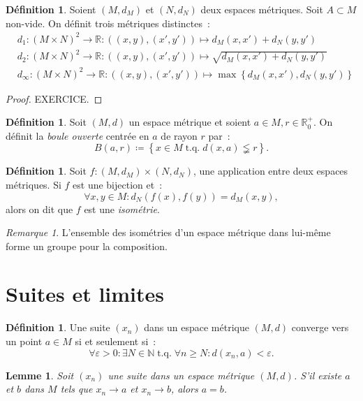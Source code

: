 \documentclass{report}
\newtheorem{lem}[thm]{Lemme}
\theoremstyle{definition}
\newtheorem{déf}[thm]{Définition}
\theoremstyle{remark}
\newtheorem*{rmq}{Remarque}
\DeclareMathOperator{\tq}{\text{ t.q. }}
\newcommand{\R}{\mathbb R}
\newcommand{\N}{\mathbb N}
\begin{document}
			\begin{déf} Soient $(M, d_M)$ et $(N, d_N)$ deux espaces métriques. Soit $A \subset M$ non-vide. On définit trois métriques distinctes~:
			\begin{align*}
				&d_1 : (M \times N)^2 \to \R : ((x, y), (x', y')) \mapsto d_M(x, x') + d_N(y, y') \\
				&d_2 : (M \times N)^2 \to \R : ((x, y), (x', y')) \mapsto \sqrt {d_M(x, x') + d_N(y, y')} \\
				&d_\infty : (M \times N)^2 \to \R : ((x, y), (x', y')) \mapsto \max\left\{d_M(x, x'), d_N(y, y')\right\}
			\end{align*}
			\end{déf}

			\begin{proof} EXERCICE.
			\end{proof}

			\begin{déf} Soit $(M, d)$ un espace métrique et soient $a \in M, r \in \R^+_0$. On définit la \textit{boule ouverte} centrée en $a$ de rayon $r$
			par~:
			\[B(a, r) \coloneqq \left\{x \in M \tq d(x, a) \lneqq r\right\}.\]
			\end{déf}

			\begin{déf} Soit $f : (M, d_M) \times (N, d_N)$, une application entre deux espaces métriques. Si $f$ est une bijection et~:
			\[\forall x, y \in M : d_N(f(x), f(y)) = d_M(x, y),\]
			alors on dit que $f$ est une \textit{isométrie}. \end{déf}

			\begin{rmq} L'ensemble des isométries d'un espace métrique dans lui-même forme un groupe pour la composition. \end{rmq}

	\section{Suites et limites}
		\begin{déf} Une suite $(x_n)$ dans un espace métrique $(M, d)$ converge vers un point $a \in M$ si et seulement si~:
		\[\forall \varepsilon > 0 : \exists N \in \N \tq \forall n \geq N : d(x_n, a) < \varepsilon.\]
		\end{déf}

		\begin{lem} Soit $(x_n)$ une suite dans un espace métrique $(M, d)$. S'il existe $a$ et $b$ dans $M$ tels que $x_n \to a$ et $x_n \to b$, alors $a=b$.
		\end{lem}
\end{document}
